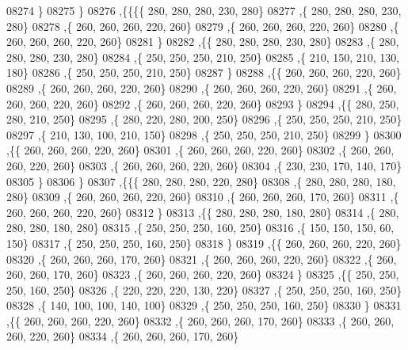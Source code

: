 \begin{DoxyCode}
08274    \}
08275   \}
08276  ,\{\{\{\{   280,   280,   280,   230,   280\}
08277     ,\{   280,   280,   280,   230,   280\}
08278     ,\{   260,   260,   260,   220,   260\}
08279     ,\{   260,   260,   260,   220,   260\}
08280     ,\{   260,   260,   260,   220,   260\}
08281     \}
08282    ,\{\{   280,   280,   280,   230,   280\}
08283     ,\{   280,   280,   280,   230,   280\}
08284     ,\{   250,   250,   250,   210,   250\}
08285     ,\{   210,   150,   210,   130,   180\}
08286     ,\{   250,   250,   250,   210,   250\}
08287     \}
08288    ,\{\{   260,   260,   260,   220,   260\}
08289     ,\{   260,   260,   260,   220,   260\}
08290     ,\{   260,   260,   260,   220,   260\}
08291     ,\{   260,   260,   260,   220,   260\}
08292     ,\{   260,   260,   260,   220,   260\}
08293     \}
08294    ,\{\{   280,   250,   280,   210,   250\}
08295     ,\{   280,   220,   280,   200,   250\}
08296     ,\{   250,   250,   250,   210,   250\}
08297     ,\{   210,   130,   100,   210,   150\}
08298     ,\{   250,   250,   250,   210,   250\}
08299     \}
08300    ,\{\{   260,   260,   260,   220,   260\}
08301     ,\{   260,   260,   260,   220,   260\}
08302     ,\{   260,   260,   260,   220,   260\}
08303     ,\{   260,   260,   260,   220,   260\}
08304     ,\{   230,   230,   170,   140,   170\}
08305     \}
08306    \}
08307   ,\{\{\{   280,   280,   280,   220,   280\}
08308     ,\{   280,   280,   280,   180,   280\}
08309     ,\{   260,   260,   260,   220,   260\}
08310     ,\{   260,   260,   260,   170,   260\}
08311     ,\{   260,   260,   260,   220,   260\}
08312     \}
08313    ,\{\{   280,   280,   280,   180,   280\}
08314     ,\{   280,   280,   280,   180,   280\}
08315     ,\{   250,   250,   250,   160,   250\}
08316     ,\{   150,   150,   150,    60,   150\}
08317     ,\{   250,   250,   250,   160,   250\}
08318     \}
08319    ,\{\{   260,   260,   260,   220,   260\}
08320     ,\{   260,   260,   260,   170,   260\}
08321     ,\{   260,   260,   260,   220,   260\}
08322     ,\{   260,   260,   260,   170,   260\}
08323     ,\{   260,   260,   260,   220,   260\}
08324     \}
08325    ,\{\{   250,   250,   250,   160,   250\}
08326     ,\{   220,   220,   220,   130,   220\}
08327     ,\{   250,   250,   250,   160,   250\}
08328     ,\{   140,   100,   100,   140,   100\}
08329     ,\{   250,   250,   250,   160,   250\}
08330     \}
08331    ,\{\{   260,   260,   260,   220,   260\}
08332     ,\{   260,   260,   260,   170,   260\}
08333     ,\{   260,   260,   260,   220,   260\}
08334     ,\{   260,   260,   260,   170,   260\}

\end{DoxyCode}
